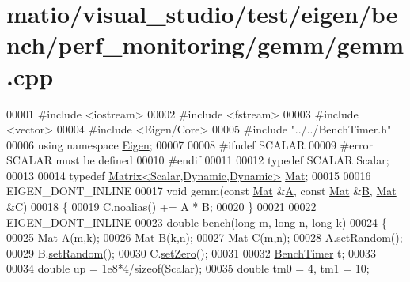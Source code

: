 \hypertarget{matio_2visual__studio_2test_2eigen_2bench_2perf__monitoring_2gemm_2gemm_8cpp_source}{}\section{matio/visual\+\_\+studio/test/eigen/bench/perf\+\_\+monitoring/gemm/gemm.cpp}
\label{matio_2visual__studio_2test_2eigen_2bench_2perf__monitoring_2gemm_2gemm_8cpp_source}

\begin{DoxyCode}
00001 \textcolor{preprocessor}{#include <iostream>}
00002 \textcolor{preprocessor}{#include <fstream>}
00003 \textcolor{preprocessor}{#include <vector>}
00004 \textcolor{preprocessor}{#include <Eigen/Core>}
00005 \textcolor{preprocessor}{#include "../../BenchTimer.h"}
00006 \textcolor{keyword}{using namespace }\hyperlink{namespace_eigen}{Eigen};
00007 
00008 \textcolor{preprocessor}{#ifndef SCALAR}
00009 \textcolor{preprocessor}{#error SCALAR must be defined}
00010 \textcolor{preprocessor}{#endif}
00011 
00012 \textcolor{keyword}{typedef} SCALAR Scalar;
00013 
00014 \textcolor{keyword}{typedef} \hyperlink{group___core___module}{Matrix<Scalar,Dynamic,Dynamic>} \hyperlink{group___core___module}{Mat};
00015 
00016 EIGEN\_DONT\_INLINE
00017 \textcolor{keywordtype}{void} gemm(\textcolor{keyword}{const} \hyperlink{group___core___module}{Mat} &\hyperlink{group___core___module_class_eigen_1_1_matrix}{A}, \textcolor{keyword}{const} \hyperlink{group___core___module}{Mat} &\hyperlink{group___core___module_class_eigen_1_1_matrix}{B}, \hyperlink{group___core___module}{Mat} &\hyperlink{group___core___module}{C})
00018 \{
00019   C.noalias() += A * B;
00020 \}
00021 
00022 EIGEN\_DONT\_INLINE
00023 \textcolor{keywordtype}{double} bench(\textcolor{keywordtype}{long} m, \textcolor{keywordtype}{long} n, \textcolor{keywordtype}{long} k)
00024 \{
00025   \hyperlink{group___core___module}{Mat} A(m,k);
00026   \hyperlink{group___core___module}{Mat} B(k,n);
00027   \hyperlink{group___core___module}{Mat} C(m,n);
00028   A.\hyperlink{class_eigen_1_1_plain_object_base_af0e576a0e1aefc9ee346de44cc352ba3}{setRandom}();
00029   B.\hyperlink{class_eigen_1_1_plain_object_base_af0e576a0e1aefc9ee346de44cc352ba3}{setRandom}();
00030   C.\hyperlink{class_eigen_1_1_plain_object_base_ac21ad5f989f320e46958b75ac8d9a1da}{setZero}();
00031   
00032   \hyperlink{class_eigen_1_1_bench_timer}{BenchTimer} t;
00033   
00034   \textcolor{keywordtype}{double} up = 1e8*4/\textcolor{keyword}{sizeof}(Scalar);
00035   \textcolor{keywordtype}{double} tm0 = 4, tm1 = 10;

\end{DoxyCode}
